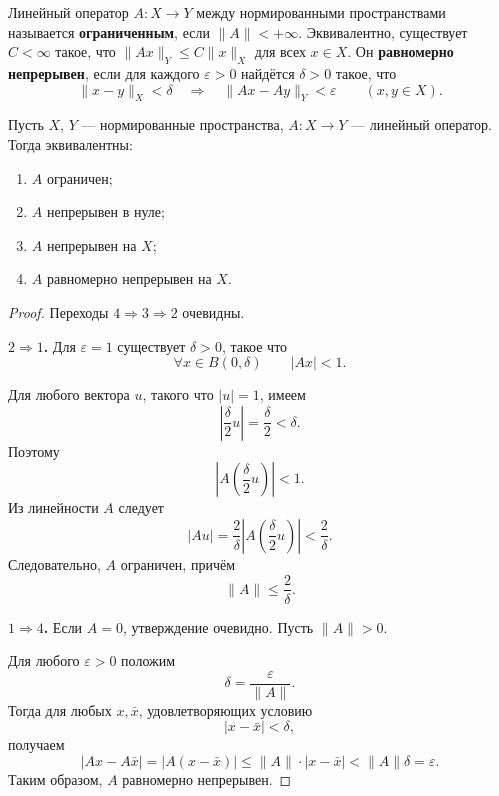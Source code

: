 \label{ticket:05}

\begin{definition}
Линейный оператор $A:X\to Y$ между нормированными пространствами называется \textbf{ограниченным}, если $\|A\|<+\infty$.
Эквивалентно, существует $C<\infty$ такое, что $\|Ax\|_Y\le C\|x\|_X$ для всех $x\in X$.
Он \textbf{равномерно непрерывен}, если для каждого $\varepsilon>0$ найдётся $\delta>0$ такое, что
\[
  \|x-y\|_X<\delta\quad\Longrightarrow\quad
  \|Ax-Ay\|_Y<\varepsilon\qquad(x,y\in X).
\]
\end{definition}

\begin{lemma}
Пусть $X$, $Y$ --- нормированные пространства, $A:X\to Y$ --- линейный оператор.
Тогда эквивалентны:
\begin{enumerate}
  \item $A$ ограничен;
  \item $A$ непрерывен в нуле;
  \item $A$ непрерывен на $X$;
  \item $A$ равномерно непрерывен на $X$.
\end{enumerate}
\end{lemma}

\begin{proof}
Переходы \(4 \Rightarrow 3 \Rightarrow 2\) очевидны.

\medskip
\noindent\textbf{\(2 \Rightarrow 1\).}
Для \(\varepsilon=1\) существует \(\delta>0\), такое что
\[
    \forall x\in B(0,\delta)
    \qquad |Ax|<1.
\]

Для любого вектора \(u\), такого что \(|u|=1\), имеем
\[
    \left|\frac{\delta}{2}u\right|
    =\frac{\delta}{2}<\delta.
\]
Поэтому
\[
    \left|A\left(\frac{\delta}{2}u\right)\right|<1.
\]
Из линейности \(A\) следует
\[
    |Au|
    =\frac{2}{\delta}
      \left|A\left(\frac{\delta}{2}u\right)\right|
    <\frac{2}{\delta}.
\]
Следовательно, \(A\) ограничен, причём
\[
    \|A\|\le\frac{2}{\delta}.
\]

\medskip
\noindent\textbf{\(1 \Rightarrow 4\).}
Если \(A=0\), утверждение очевидно.
Пусть \(\|A\|>0\).

Для любого \(\varepsilon>0\) положим
\[
    \delta=\frac{\varepsilon}{\|A\|}.
\]
Тогда для любых \(x,\bar{x}\), удовлетворяющих условию
\[
    |x-\bar{x}|<\delta,
\]
получаем
\[
    |Ax-A\bar{x}|
    =|A(x-\bar{x})|
    \le\|A\|\cdot|x-\bar{x}|
    <\|A\|\delta
    =\varepsilon.
\]
Таким образом, \(A\) равномерно непрерывен.
\end{proof}
